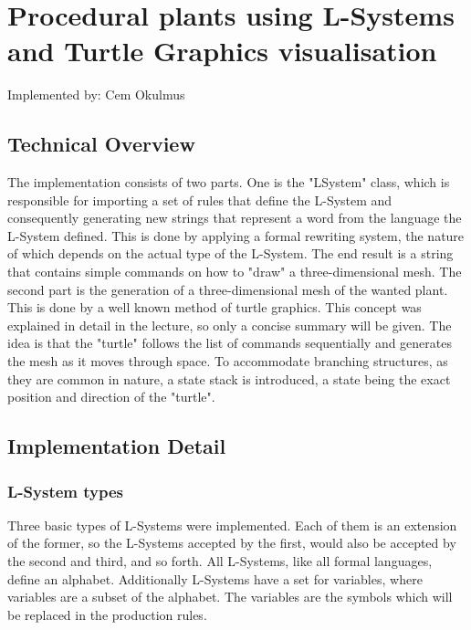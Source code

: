 \documentclass[11pt,a4paper]{article}
\begin{document}
\section{Procedural plants using L-Systems and Turtle Graphics \newline visualisation}
Implemented by: Cem Okulmus

\subsection{Technical Overview}
The implementation consists of two parts. One is the "LSystem" class, which is responsible for importing a set of rules that define the L-System and consequently generating new strings that represent a word from the language the L-System defined. This is done by applying a formal rewriting system, the nature of which depends on the actual type of the L-System. The end result is a string that contains simple commands on how to "draw" a three-dimensional mesh. 
\newline
The second part is the generation of a three-dimensional mesh of the wanted plant. This is done by a well known method of turtle graphics. This concept was explained in detail in the lecture, so only a concise summary will be given. The idea is that the "turtle" follows the list of commands sequentially and generates the mesh as it moves through space. To accommodate branching structures, as they are common in nature, a state stack is introduced, a state being the exact position and direction of the "turtle".

\subsection{Implementation Detail}

\subsubsection{L-System types}
Three basic types of L-Systems were implemented. Each of them is an extension of the former, so the L-Systems accepted by the first, would also be accepted by the second and third, and so forth. All L-Systems, like all formal languages, define an alphabet. Additionally L-Systems have a set for variables, where variables are a subset of the alphabet. The variables are the symbols which will be replaced in the production rules.
\end{document}
